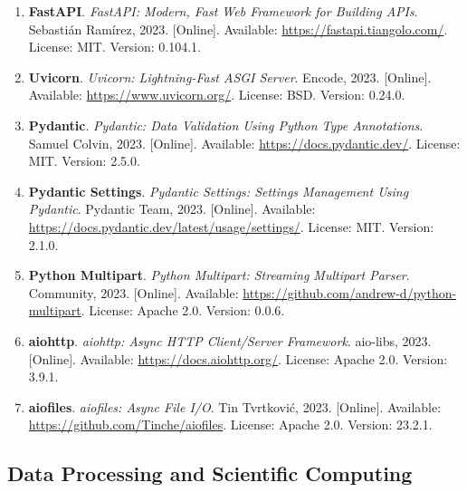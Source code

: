 \begin{enumerate}[resume]
    \item \textbf{FastAPI}. \textit{FastAPI: Modern, Fast Web Framework for Building APIs}. 
    Sebastián Ramírez, 2023. [Online]. Available: \url{https://fastapi.tiangolo.com/}. 
    License: MIT. Version: 0.104.1.
    
    \item \textbf{Uvicorn}. \textit{Uvicorn: Lightning-Fast ASGI Server}. 
    Encode, 2023. [Online]. Available: \url{https://www.uvicorn.org/}. 
    License: BSD. Version: 0.24.0.
    
    \item \textbf{Pydantic}. \textit{Pydantic: Data Validation Using Python Type Annotations}. 
    Samuel Colvin, 2023. [Online]. Available: \url{https://docs.pydantic.dev/}. 
    License: MIT. Version: 2.5.0.
    
    \item \textbf{Pydantic Settings}. \textit{Pydantic Settings: Settings Management Using Pydantic}. 
    Pydantic Team, 2023. [Online]. Available: \url{https://docs.pydantic.dev/latest/usage/settings/}. 
    License: MIT. Version: 2.1.0.
    
    \item \textbf{Python Multipart}. \textit{Python Multipart: Streaming Multipart Parser}. 
    Community, 2023. [Online]. Available: \url{https://github.com/andrew-d/python-multipart}. 
    License: Apache 2.0. Version: 0.0.6.
    
    \item \textbf{aiohttp}. \textit{aiohttp: Async HTTP Client/Server Framework}. 
    aio-libs, 2023. [Online]. Available: \url{https://docs.aiohttp.org/}. 
    License: Apache 2.0. Version: 3.9.1.
    
    \item \textbf{aiofiles}. \textit{aiofiles: Async File I/O}. 
    Tin Tvrtković, 2023. [Online]. Available: \url{https://github.com/Tinche/aiofiles}. 
    License: Apache 2.0. Version: 23.2.1.
\end{enumerate}

\subsection*{Data Processing and Scientific Computing}

